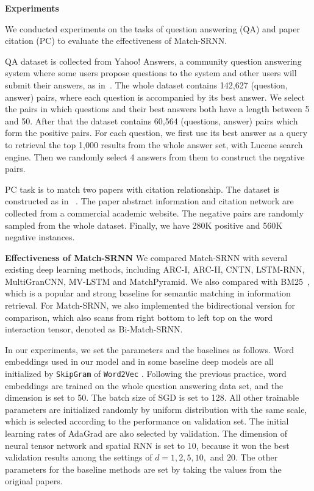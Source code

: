 \textbf{Experiments}

We conducted experiments on the tasks of question answering (QA) and paper citation (PC) to evaluate the effectiveness of Match-SRNN.

QA dataset is collected from Yahoo! Answers, a community question answering system where some users propose questions to the system and other users will submit their answers, as in~\cite{wan2016aaai}.
The whole dataset contains 142,627 (question, answer) pairs, where each question is accompanied by its best answer.
We select the pairs in which questions and their best answers both have a length between 5 and 50.
After that the dataset contains 60,564 (questions, answer) pairs which form the positive pairs. For each question, we first use its best answer as a query to retrieval the top 1,000 results from the whole answer set, with Lucene search engine. Then we randomly select 4 answers from them to construct the negative pairs. %

PC task is to match two papers with citation relationship.
The dataset is constructed as in ~\cite{pang2016aaai}.
The paper abstract information and citation network are collected from a commercial academic website.
The negative pairs are randomly sampled from the whole dataset.
Finally, we have 280K positive and 560K negative instances.

\textbf{Effectiveness of Match-SRNN}
We compared Match-SRNN with several existing deep learning methods, including ARC-I, ARC-II, CNTN, LSTM-RNN, MultiGranCNN, MV-LSTM and MatchPyramid. We also compared with BM25~\cite{robertson1995okapi}, which is a popular and strong baseline for semantic matching in information retrieval. For Match-SRNN, we also implemented the bidirectional version for comparison, which also scans from right bottom to left top on the word interaction tensor, denoted as Bi-Match-SRNN.

In our experiments, we set the parameters and the baselines as follows.
Word embeddings used in our model and in some baseline deep models are all initialized by \texttt{SkipGram} of \texttt{Word2Vec} \cite{mikolov2013distributed}.
Following the previous practice, word embeddings are trained on the whole question answering data set, and the dimension is set to 50.
The batch size of SGD is set to 128. All other trainable parameters are initialized randomly by uniform distribution with the same scale, which is selected according to the performance on validation set. The initial learning rates of AdaGrad are also selected by validation. The dimension of neural tensor network and spatial RNN is set to 10, because it won the best validation results among the settings of $d=1,2,5,10,$ and $20$. The other parameters for the baseline methods are set by taking the values from the original papers.

